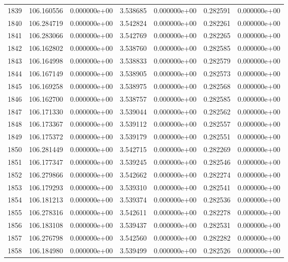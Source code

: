 \begin{tabular}{rrrrrrr}
1839 & 106.160556 &  0.000000e+00 &  3.538685 &  0.000000e+00 &    0.282591 &  0.000000e+00 \\
1840 & 106.284719 &  0.000000e+00 &  3.542824 &  0.000000e+00 &    0.282261 &  0.000000e+00 \\
1841 & 106.283066 &  0.000000e+00 &  3.542769 &  0.000000e+00 &    0.282265 &  0.000000e+00 \\
1842 & 106.162802 &  0.000000e+00 &  3.538760 &  0.000000e+00 &    0.282585 &  0.000000e+00 \\
1843 & 106.164998 &  0.000000e+00 &  3.538833 &  0.000000e+00 &    0.282579 &  0.000000e+00 \\
1844 & 106.167149 &  0.000000e+00 &  3.538905 &  0.000000e+00 &    0.282573 &  0.000000e+00 \\
1845 & 106.169258 &  0.000000e+00 &  3.538975 &  0.000000e+00 &    0.282568 &  0.000000e+00 \\
1846 & 106.162700 &  0.000000e+00 &  3.538757 &  0.000000e+00 &    0.282585 &  0.000000e+00 \\
1847 & 106.171330 &  0.000000e+00 &  3.539044 &  0.000000e+00 &    0.282562 &  0.000000e+00 \\
1848 & 106.173367 &  0.000000e+00 &  3.539112 &  0.000000e+00 &    0.282557 &  0.000000e+00 \\
1849 & 106.175372 &  0.000000e+00 &  3.539179 &  0.000000e+00 &    0.282551 &  0.000000e+00 \\
1850 & 106.281449 &  0.000000e+00 &  3.542715 &  0.000000e+00 &    0.282269 &  0.000000e+00 \\
1851 & 106.177347 &  0.000000e+00 &  3.539245 &  0.000000e+00 &    0.282546 &  0.000000e+00 \\
1852 & 106.279866 &  0.000000e+00 &  3.542662 &  0.000000e+00 &    0.282274 &  0.000000e+00 \\
1853 & 106.179293 &  0.000000e+00 &  3.539310 &  0.000000e+00 &    0.282541 &  0.000000e+00 \\
1854 & 106.181213 &  0.000000e+00 &  3.539374 &  0.000000e+00 &    0.282536 &  0.000000e+00 \\
1855 & 106.278316 &  0.000000e+00 &  3.542611 &  0.000000e+00 &    0.282278 &  0.000000e+00 \\
1856 & 106.183108 &  0.000000e+00 &  3.539437 &  0.000000e+00 &    0.282531 &  0.000000e+00 \\
1857 & 106.276798 &  0.000000e+00 &  3.542560 &  0.000000e+00 &    0.282282 &  0.000000e+00 \\
1858 & 106.184980 &  0.000000e+00 &  3.539499 &  0.000000e+00 &    0.282526 &  0.000000e+00 \\

\end{tabular}
